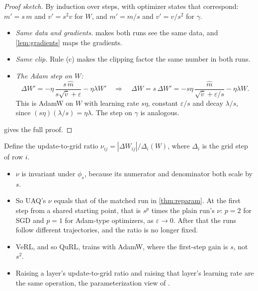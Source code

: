 \begin{proof}[Proof sketch]
By induction over steps, with optimizer states that correspond: $m'=s\,m$ and $v'=s^2v$ for $W$, and $m'=m/s$ and $v'=v/s^2$ for $\gamma$.
\begin{itemize}[leftmargin=*,itemsep=1pt]
\item \emph{Same data and gradients.}  makes both runs see the same data, and \cref{lem:gradients} maps the gradients.
\item \emph{Same clip.} Rule (c) makes the clipping factor the same number in both runs.
\item \emph{The Adam step on $W$:}
\[
\Delta W'=-\eta\,\frac{s\,\hat m}{s\sqrt{\hat v}+\varepsilon}-\eta\lambda W'
\quad\Longrightarrow\quad
\Delta W=s\,\Delta W'=-s\eta\,\frac{\hat m}{\sqrt{\hat v}+\varepsilon/s}-\eta\lambda W .
\]
This is AdamW on $W$ with learning rate $s\eta$, constant $\varepsilon/s$ and decay $\lambda/s$, since $(s\eta)(\lambda/s)=\eta\lambda$. The step on $\gamma$ is analogous.
\end{itemize}
 gives the full proof.
\end{proof}

\begin{corollary}\label{cor:ratio}
Define the update-to-grid ratio $\nu_{ij}=|\Delta W_{ij}|/\Delta_i(W)$, where $\Delta_i$ is the grid step of row $i$.
\begin{itemize}[leftmargin=*,itemsep=1pt]
\item $\nu$ is invariant under $\phi_s$, because its numerator and denominator both scale by $s$.
\item So UAQ's $\nu$ equals that of the matched run in \cref{thm:reparam}. At the first step from a shared starting point, that is $s^p$ times the plain run's $\nu$: $p=2$ for SGD and $p=1$ for Adam-type optimizers, as $\varepsilon\to0$. After that the runs follow different trajectories, and the ratio is no longer fixed.
\item VeRL, and so QuRL, trains with AdamW, where the first-step gain is $s$, not $s^2$.
\item Raising a layer's update-to-grid ratio and raising that layer's learning rate are the same operation, the parameterization view of \citet{yang2021tp4,yang2022tp5}.
\end{itemize}
\end{corollary}

